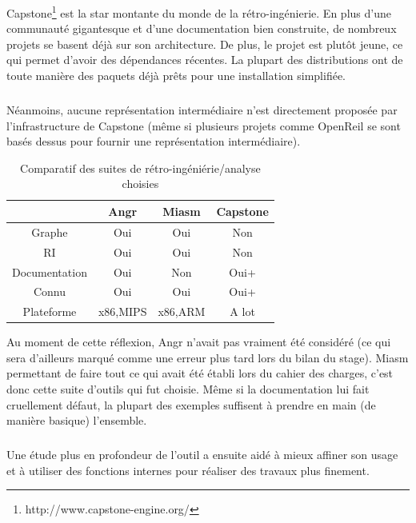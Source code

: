 \begin{center}
\end{center}
Capstone\footnote{http://www.capstone-engine.org/} est la star montante du monde de la rétro-ingénierie. En plus d'une communauté gigantesque et d'une
documentation bien construite, de nombreux projets se basent déjà sur son architecture. De plus, le projet est plutôt jeune, ce qui permet d'avoir des
dépendances récentes. La plupart des distributions ont de toute manière des paquets déjà prêts pour une installation simplifiée.
\subparagraph{}
Néanmoins, aucune représentation intermédiaire n'est directement proposée par l'infrastructure de Capstone (même si plusieurs projets comme OpenReil se sont basés
dessus pour fournir une représentation intermédiaire).



\begin{table}[h]
    \centering
    \caption{Comparatif des suites de rétro-ingéniérie/analyse choisies}
    \label{itd}
    \begin{tabular}{c|c|c|c}
                      & Angr     & Miasm   & Capstone \\
        \hline
        Graphe        & Oui      & Oui     & Non      \\
        \hline
        RI            & Oui      & Oui     & Non      \\
        \hline
        Documentation & Oui      & Non     & Oui+     \\
        \hline
        Connu         & Oui      & Oui     & Oui+     \\
        \hline
        Plateforme    & x86,MIPS & x86,ARM & A lot
    \end{tabular}
\end{table}

Au moment de cette réflexion, Angr n'avait pas vraiment été
considéré (ce qui sera d'ailleurs marqué comme une erreur plus tard lors du bilan du stage).
Miasm permettant de faire tout ce qui avait été établi lors du cahier des charges, c'est donc cette suite d'outils qui fut choisie.
Même si la documentation lui fait cruellement défaut, la plupart des exemples suffisent à prendre en main (de manière basique) l'ensemble.
\subparagraph{}
Une étude plus en profondeur de l'outil a ensuite aidé à mieux affiner son usage et à utiliser des fonctions internes pour réaliser des travaux
plus finement.

